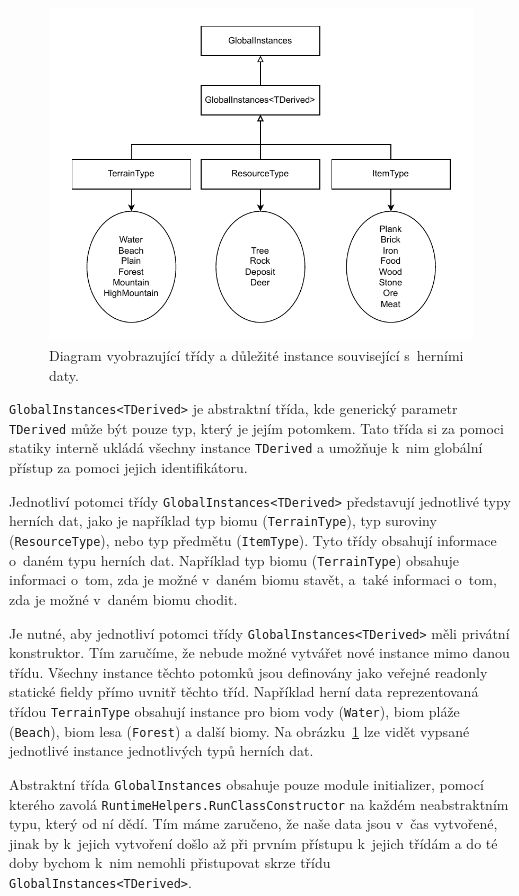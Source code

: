 \begin{figure}[!htb]
  \centering
  \includegraphics[width=0.7\linewidth]{img/game-data.pdf}
  \caption{Diagram vyobrazující třídy a důležité instance související s~herními daty.}
  \label{fig:game-data}
\end{figure}

\texttt{GlobalInstances<TDerived>} je abstraktní třída, kde generický parametr \texttt{TDerived} může být pouze typ, který je jejím potomkem. Tato třída si za pomoci statiky interně ukládá všechny instance \texttt{TDerived} a umožňuje k~nim globální přístup za pomoci jejich identifikátoru.

Jednotliví potomci třídy \texttt{GlobalInstances<TDerived>} představují jednotlivé typy herních dat, jako je například typ biomu (\texttt{TerrainType}), typ suroviny (\texttt{ResourceType}), nebo typ předmětu (\texttt{ItemType}). Tyto třídy obsahují informace o~daném typu herních dat. Například typ biomu (\texttt{TerrainType}) obsahuje informaci o~tom, zda je možné v~daném biomu stavět, a~také informaci o~tom, zda je možné v~daném biomu chodit.

Je nutné, aby jednotliví potomci třídy \texttt{GlobalInstances<TDerived>} měli privátní konstruktor. Tím zaručíme, že nebude možné vytvářet nové instance mimo danou třídu. Všechny instance těchto potomků jsou definovány jako veřejné readonly statické fieldy přímo uvnitř těchto tříd.  Například herní data reprezentovaná třídou \texttt{TerrainType} obsahují instance pro biom vody (\texttt{Water}), biom pláže (\texttt{Beach}), biom lesa (\texttt{Forest}) a další biomy. Na obrázku~\ref{fig:game-data} lze vidět vypsané jednotlivé instance jednotlivých typů herních dat.

Abstraktní třída \texttt{GlobalInstances} obsahuje pouze module initializer, pomocí kterého zavolá \texttt{RuntimeHelpers.RunClassConstructor} na každém neabstraktním typu, který od ní dědí. Tím máme zaručeno, že naše data jsou v~čas vytvořené, jinak by k~jejich vytvoření došlo až při prvním přístupu k~jejich třídám a do té doby bychom k~nim nemohli přistupovat skrze třídu \texttt{GlobalInstances<TDerived>}.

